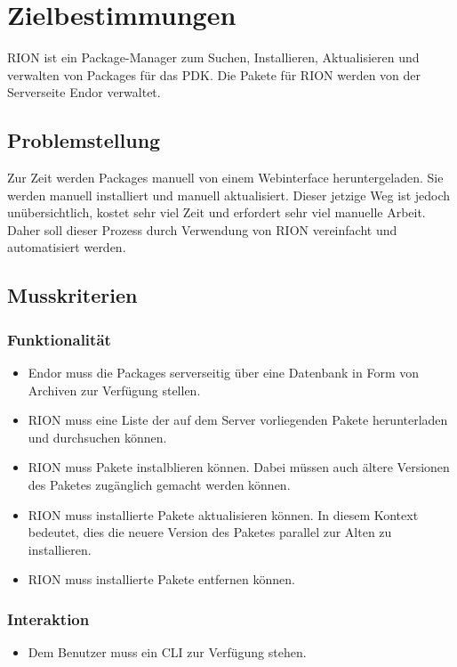 \chapter{Zielbestimmungen}

RION ist ein Package-Manager zum Suchen, Installieren, Aktualisieren und verwalten von Packages für das PDK. Die Pakete für RION werden von der Serverseite Endor verwaltet.

\section{Problemstellung}
Zur Zeit werden Packages manuell von einem Webinterface heruntergeladen. Sie werden manuell installiert und manuell aktualisiert. Dieser jetzige Weg ist jedoch unübersichtlich, kostet sehr viel Zeit und erfordert sehr viel manuelle Arbeit. Daher soll dieser Prozess durch Verwendung von RION vereinfacht und automatisiert werden.

\section{Musskriterien}
\subsection{Funktionalität}
\begin{itemize}
		\item Endor muss die Packages serverseitig über eine Datenbank in Form von Archiven zur Verfügung stellen.
		\item RION muss eine Liste der auf dem Server vorliegenden Pakete herunterladen und durchsuchen können.
		\item RION muss Pakete instalblieren können. Dabei müssen auch ältere Versionen des Paketes zugänglich gemacht werden können.
		\item RION muss installierte Pakete aktualisieren können. In diesem Kontext bedeutet, dies die neuere Version des Paketes parallel zur Alten zu installieren.
		\item RION muss installierte Pakete entfernen können.
\end{itemize}

\subsection{Interaktion}


\begin{itemize}
	\item Dem Benutzer muss ein CLI zur Verfügung stehen.
\end{itemize}

